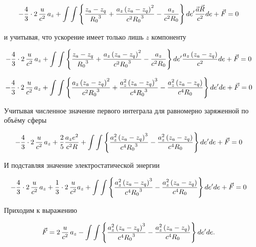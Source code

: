 \documentclass[12pt]{article}
\begin{document}
$$-\frac{4}{3}\cdot 2 \,\frac{u}{c^2} \, a_z + \int \int
\left\{ \frac{z_a-z_q}{{{R}_{0}}^3}+\frac{a_z\left( {{z}_{a}}-{{z}_{q}} \right)^2}{c^2{{{R}_{0}}^3}}  -\frac{{a_z}}{{{c}^{2}}{{{R}_{0}}}}\\
 \right\}\\
de'\frac{\vec a \vec R}{c^2} de + \vec F = 0$$

и учитывая, что ускорение имеет только лишь $z$ компоненту

$$-\frac{4}{3}\cdot 2 \,\frac{u}{c^2} \, a_z + \int \int
\left\{ \frac{z_a-z_q}{{{R}_{0}}^3}+\frac{a_z\left( {{z}_{a}}-{{z}_{q}} \right)^2}{c^2{{{R}_{0}}^3}}  -\frac{{a_z}}{{{c}^{2}}{{{R}_{0}}}}\\
 \right\}\\
de'\frac{a_z \left(z_a-z_q\right)}{c^2} de + \vec F = 0$$


$$-\frac{4}{3}\cdot 2 \,\frac{u}{c^2} \, a_z + \int \int
\left\{ \frac{a_z\left(z_a-z_q\right)^2}{{c}^{2}{{R}_{0}}^3}+\frac{a_z^2\left( {{z}_{a}}-{{z}_{q}} \right)^3}{c^4{{{R}_{0}}^3}}  -\frac{{a_z^2}\left(z_a-z_q\right)}{{{c}^{4}}{{{R}_{0}}}}\\
 \right\}\\
de' de + \vec F = 0$$

Учитывая численное значение первого интеграла для равномерно заряженной по объёму сферы

$$-\frac{4}{3}\cdot 2 \,\frac{u}{c^2} \, a_z + \frac{2}{5} \frac{a_z e^2}{c^2{R}} + \int \int \left\{
\frac{a_z^2\left( {{z}_{a}}-{{z}_{q}} \right)^3}{c^4{{{R}_{0}}^3}}  -\frac{{a_z^2}\left(z_a-z_q\right)}{{{c}^{4}}{{{R}_{0}}}}\\
 \right\}\\
de' de + \vec F = 0$$

И подставляя значение электростатической энергии

$$-\frac{4}{3}\cdot 2 \,\frac{u}{c^2} \, a_z + \frac{1}{3} \cdot 2 \, \frac{u}{c^2} a_z + \int \int \left\{
\frac{a_z^2\left( {{z}_{a}}-{{z}_{q}} \right)^3}{c^4{{{R}_{0}}^3}}  -\frac{{a_z^2}\left(z_a-z_q\right)}{{{c}^{4}}{{{R}_{0}}}}\\
 \right\}\\
de' de + \vec F = 0$$


Приходим к выражению 

$$\vec F =  2 \,\frac{u}{c^2} \, a_z - \int \int \left\{
\frac{a_z^2\left( {{z}_{a}}-{{z}_{q}} \right)^3}{c^4{{{R}_{0}}^3}}  -\frac{{a_z^2}\left(z_a-z_q\right)}{{{c}^{4}}{{{R}_{0}}}}\\
 \right\} de' de.$$
\end{document}
